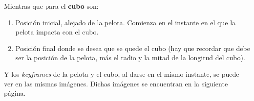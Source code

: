 \documentclass{article}
\begin{document}





Mientras que para el \textbf{cubo} son:

\begin{enumerate}
    \item Posición inicial, alejado de la pelota. Comienza en el instante en el que la pelota impacta con el cubo.
    \item Posición final donde se desea que se quede el cubo (hay que recordar que debe ser la posición de la pelota, más el radio y la mitad de la longitud del cubo).
\end{enumerate}

Y los \textit{keyframes} de la pelota y el cubo, al darse en el mismo instante, se puede ver en las mismas imágenes. Dichas imágenes se encuentran en la siguiente página.

\end{document}
